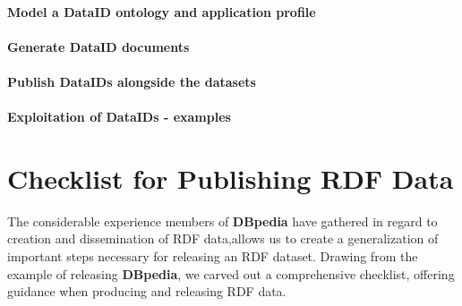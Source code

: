 \documentclass[a4paper,english,twoside,BCOR1.5cm,headsepline,DIV12,appendixprefix,final,12pt]{scrbook}
\newcommand{\dbpedia}{{\ttfamily\bfseries DBpedia}\xspace}
\begin{document}
\paragraph{Model a DataID ontology and application profile}
\label{sec:wfmodel}

\paragraph{Generate DataID documents}
\label{sec:wfgenerate}

\paragraph{Publish DataIDs alongside the datasets}
\label{sec:wfmodel}

\paragraph{Exploitation of DataIDs - examples}
\label{sec:wfexploit}

\section{Checklist for Publishing RDF Data} 
\label{sec:checklist}

The considerable experience members of \dbpedia have gathered in regard to creation and dissemination of RDF data,allows us to create a generalization of important steps necessary for releasing an RDF dataset.  Drawing from the example  of  releasing  \dbpedia,  we  carved  out  a comprehensive checklist, offering guidance when producing and releasing RDF data.
\end{document}
